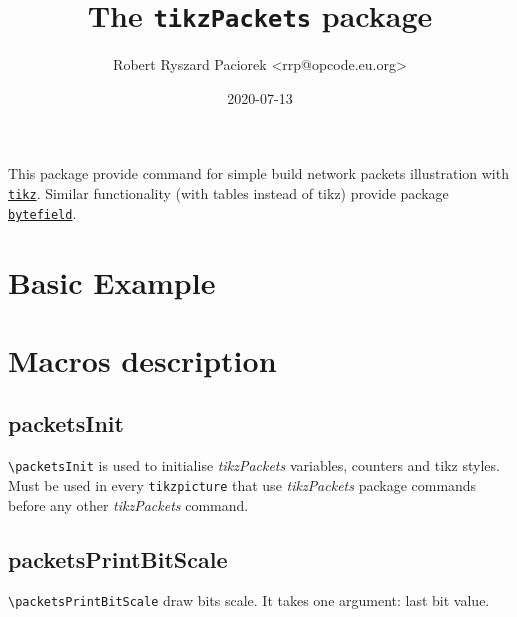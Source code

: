 \documentclass[a4paper]{article}
\newcommand{\pkgLink}[1]{\texttt{\href{https://ctan.org/pkg/#1}{#1}}}
\begin{document}
\title{The \texttt{tikzPackets}  package}
\author{Robert Ryszard Paciorek <rrp@opcode.eu.org>}
\date{2020-07-13}
\maketitle

This package provide command for simple build network packets illustration with \pkgLink{tikz}.
Similar functionality (with tables instead of tikz) provide package \pkgLink{bytefield}.

\section{Basic Example}

\begin{CenterExample}
\end{CenterExample}


\section{Macros description}

\subsection{packetsInit}

\Verb$\packetsInit$ is used to initialise \textit{tikzPackets} variables, counters and tikz styles.
Must be used in every \Verb$tikzpicture$ that use \textit{tikzPackets} package commands before any other \textit{tikzPackets} command.

\subsection{packetsPrintBitScale}

\Verb$\packetsPrintBitScale$ draw bits scale. It takes one argument: last bit value.
\end{document}
